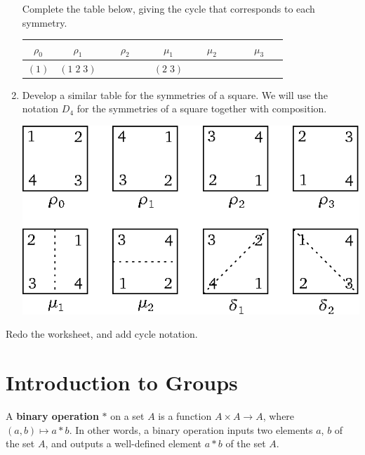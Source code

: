 \begin{enumerate}
Complete the table below, giving the cycle that corresponds to each symmetry.
    \begin{center}
   \renewcommand{\arraystretch}{1.3}
    \begin{tabular}{|c|c|c|c|c|c|} \hline
         $\rho_0$ & $\rho_1$ & $\rho_2$ & $\mu_1$ & $\mu_2$ & $\mu_3$ \\ \hline
         $(1)$ & $(1\; 2\; 3)$ & $\phantom{(1\; 2\; 3)}$ & $(2\; 3)$ & $\phantom{(1\; 2\; 3)}$ & $\phantom{(1\; 2\; 3)}$ \\ \hline
    \end{tabular}
    \end{center}

    \item Develop a similar table for the symmetries of a square. We will use the notation $D_4$ for the symmetries of a square together with composition.
    \begin{center}
        \includegraphics{wssquares.eps}
    \end{center}

\end{enumerate}
Redo the worksheet, and add cycle notation.

\chapter{Introduction to Groups}

\begin{definition}
    A \textbf{binary operation} \(*\) on a set \(A\) is a function \(A \times A \rightarrow A\), where \((a,b) \mapsto a*b\).  In other words, a binary operation inputs two elements \(a\), \(b\) of the set \(A\), and outputs a well-defined element \(a * b\) of the set \(A\).
\end{definition}

